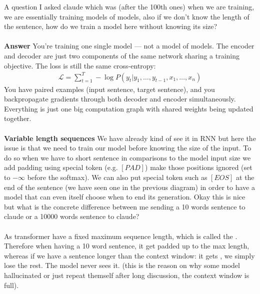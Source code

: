 \begin{framedremark}
A question I asked claude which was (after the 100th ones) when we are training, we are essentially training models of models, also if we don't know the length of the sentence, how do we train a model here without knowing its size?\\
$ $\\
\textbf{Answer}
You're training one single model — not a model of models. The encoder and decoder are just two components of the same network sharing a training objective. The loss is still the same cross-entropy:
\begin{align*} 
	\mathcal{L} = \sum_{t= 1}^{T} - \log P\left(y_t | y_1, \ldots, y_{t - 1}, x_1, \ldots, x_n\right)
\end{align*}
You have paired examples (input sentence, target sentence), and you backpropagate gradients through both decoder and encoder simultaneously. Everything is just one big computation graph with shared weights being updated together.\\
$ $\\
\textbf{Variable length sequences}
We have already kind of see it in RNN but here the issue is that we need to train our model before knowing the size of the input. To do so when we have to short sentence in comparisons to the model input size we add padding using special token (e.g. $\left[PAD\right]$) make those positions ignored (set to $-\infty$ before the softmax). We can also put special token such as $\left[EOS\right]$ at the end of the sentence (we have seen one in the previous diagram) in order to have a model that can even itself choose when to end its generation. Okay this is nice but what is the concrete difference between me sending a 10 words sentence to claude or a 10000 words sentence to claude?\\
$ $\\
As transformer have a fixed maximum sequence length, which is called the . Therefore when having a 10 word sentence, it get padded up to the max length, whereas if we have a sentence longer than the context window: it gets , we simply lose the rest. The model never sees it. (this is the reason on why some model hallucinated or just repeat themself after long discussion, the context window is full). 
\end{framedremark}



